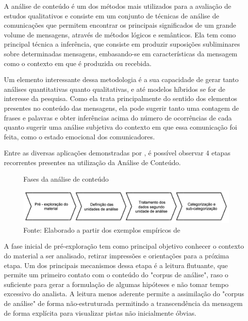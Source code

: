 A análise de conteúdo é um dos métodos mais utilizados para a avaliação de estudos qualitativos e consiste em um conjunto de técnicas de análise de comunicações que permitem encontrar os principais significados de um grande volume de mensagens, através de métodos lógicos e semânticos. Ela tem como principal técnica a inferência, que consiste em produzir suposições subliminares sobre determinadas mensagens, embasando-se em características da mensagem como o contexto em que é produzida ou recebida. \cite{bardin}

Um elemento interessante dessa metodologia é a sua capacidade de gerar tanto análises quantitativas quanto qualitativas, e até modelos híbridos se for de interesse da pesquisa. Como ela trata principalmente do sentido dos elementos presentes no conteúdo das mensagens, ela pode sugerir tanto uma contagem de frases e palavras e obter inferências acima do número de ocorrências de cada quanto sugerir uma análise subjetiva do contexto em que essa comunicação foi feita, como o estado emocional dos comunicadores.

Entre as diversas aplicações demonstradas por , é possível observar 4 etapas recorrentes presentes na utilização da Análise de Conteúdo. 

\begin{figure}[h]
\caption{Fases da análise de conteúdo}
\centerline{\includegraphics[scale=0.5]{img/fasesanalisedeconteudo}}
\label{fig:fasesanalisedeconteudo}
\caption* {Fonte: Elaborado a partir dos exemplos empíricos de }
\end{figure}

A fase inicial de pré-exploração tem como principal objetivo conhecer o contexto do material a ser analisado, retirar impressões e orientações para a próxima etapa. Um dos principais mecanismos dessa etapa é a leitura flutuante, que permite um primeiro contato com o conteúdo do "corpus de análise", raso o suficiente para gerar a formulação de algumas hipóteses e não tomar tempo excessivo do analista. A leitura menos aderente permite a assimilação do "corpus de análise" de forma não-estruturada permitindo a transcendência da mensagem de forma explícita para visualizar pistas não inicialmente óbvias.

